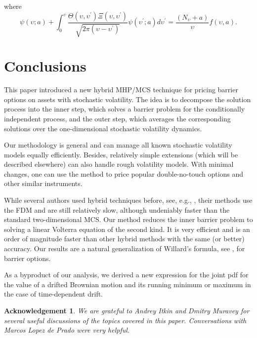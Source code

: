 \documentclass{article}
\newtheorem{acknowledgement}[theorem]{Acknowledgement}
\begin{document}
where%
\begin{equation}
\psi \left( \upsilon ;a\right) +\int_{0}^{\upsilon }\frac{\Theta \left(
\upsilon ,\upsilon ^{\prime }\right) \Xi \left( \upsilon ,\upsilon ^{\prime
}\right) }{\sqrt{2\pi \left( \upsilon -\upsilon ^{\prime }\right) }}\psi
\left( \upsilon ^{\prime };a\right) d\upsilon ^{\prime }=\frac{\left(
N_{\upsilon }+a\right) }{\upsilon }f\left( \upsilon ,a\right) .  \label{Eq92}
\end{equation}

\section{Conclusions\label{Sec6}}

This paper introduced a new hybrid MHP/MCS technique for pricing barrier
options on assets with stochastic volatility. The idea is to decompose the
solution process into the inner step, which solves a barrier problem for the
conditionally independent process, and the outer step, which averages the
corresponding solutions over the one-dimensional stochastic volatility
dynamics.

Our methodology is general and can manage all known stochastic volatility
models equally efficiently. Besides, relatively simple extensions (which
will be described elsewhere) can also handle rough volatility models. With
minimal changes, one can use the method to price popular double-no-touch
options and other similar instruments.

While several authors used hybrid techniques before, see, e.g., \cite%
{Loeper2009}, their methods use the FDM and are still relatively slow,
although undeniably faster than the standard two-dimensional MCS. Our method
reduces the inner barrier problem to solving a linear Volterra equation of
the second kind. It is very efficient and is an order of magnitude faster
than other hybrid methods with the same (or better) accuracy. Our results
are a natural generalization of Willard's formula, see \cite{Willard1997},
for barrier options.

As a byproduct of our analysis, we derived a new expression for the joint
pdf for the value of a drifted Brownian motion and its running minimum or
maximum in the case of time-dependent drift.

\begin{acknowledgement}
We are grateful to Andrey Itkin and Dmitry Muravey for several useful
discussions of the topics covered in this paper. Conversations with Marcos
Lopez de Prado were very helpful.
\end{acknowledgement}
\end{document}
